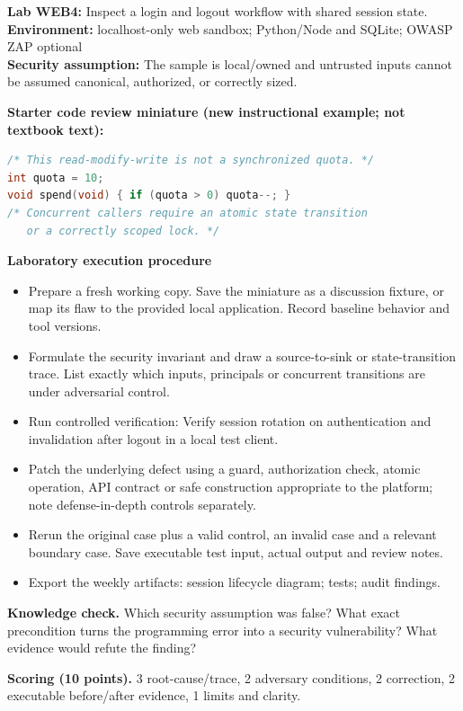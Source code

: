 \documentclass[10pt,letterpaper]{article}
\begin{document}
\begin{insight}\textbf{Lab WEB4:} Inspect a login and logout workflow with shared session state.\\\textbf{Environment:} localhost-only web sandbox; Python/Node and SQLite; OWASP ZAP optional\\\textbf{Security assumption:} The sample is local/owned and untrusted inputs cannot be assumed canonical, authorized, or correctly sized.\end{insight}
\textbf{Starter code review miniature (new instructional example; not textbook text):}
\begin{lstlisting}[language=C]
/* This read-modify-write is not a synchronized quota. */
int quota = 10;
void spend(void) { if (quota > 0) quota--; }
/* Concurrent callers require an atomic state transition
   or a correctly scoped lock. */
\end{lstlisting}
\textbf{Laboratory execution procedure}
\begin{itemize}[leftmargin=*,itemsep=2pt]
\item Prepare a fresh working copy. Save the miniature as a discussion fixture, or map its flaw to the provided local application. Record baseline behavior and tool versions.
\item Formulate the security invariant and draw a source-to-sink or state-transition trace. List exactly which inputs, principals or concurrent transitions are under adversarial control.
\item Run controlled verification: Verify session rotation on authentication and invalidation after logout in a local test client.
\item Patch the underlying defect using a guard, authorization check, atomic operation, API contract or safe construction appropriate to the platform; note defense-in-depth controls separately.
\item Rerun the original case plus a valid control, an invalid case and a relevant boundary case. Save executable test input, actual output and review notes.
\item Export the weekly artifacts: session lifecycle diagram; tests; audit findings.
\end{itemize}
\textbf{Knowledge check.} Which security assumption was false? What exact precondition turns the programming error into a security vulnerability? What evidence would refute the finding?

\textbf{Scoring (10 points).} 3 root-cause/trace, 2 adversary conditions, 2 correction, 2 executable before/after evidence, 1 limits and clarity.
\end{document}
